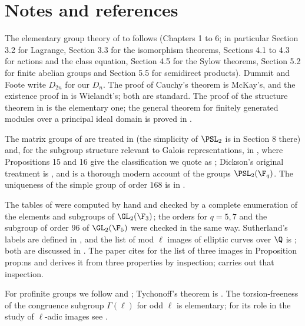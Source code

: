 \section{Notes and references}\label{sec:groups:notes}

The elementary group theory of  to  follows \cite{DummitFoote} (Chapters 1 to 6; in particular Section 3.2 for
Lagrange, Section 3.3 for the isomorphism theorems, Sections 4.1 to 4.3 for actions and the class equation, Section 4.5 for the Sylow theorems, Section 5.2 for
finite abelian groups and Section 5.5 for semidirect products). Dummit and Foote write $D_{2n}$ for our $D_n$. The proof of Cauchy's theorem is McKay's, and the
existence proof in  is Wielandt's; both are standard. The proof of the structure theorem in  is the elementary
one; the general theorem for finitely generated modules over a principal ideal domain is proved in .

The matrix groups of  are treated in \cite[Chapter XIII]{Lang} (the simplicity of $\PSL_2$ is in Section 8 there) and, for the subgroup
structure relevant to Galois representations, in \cite[Section 2]{Serre72}, where Propositions 15 and 16 give the classification we quote as
; Dickson's original treatment is \cite{Dickson1901}, and \cite[Chapter II, Section 8]{Huppert67} is a thorough modern account of the groups
$\PSL_2(\F_q)$. The uniqueness of the simple group of order $168$ is in \cite[Section 6.2]{DummitFoote}.

The tables of  were computed by hand and checked by a complete enumeration of the elements and subgroups of $\GL_2(\F_3)$; the orders for
$q=5,7$ and the subgroup of order $96$ of $\GL_2(\F_5)$ were checked in the same way. Sutherland's labels are defined in \cite{Sutherland16}, and the list of mod $\ell$
images of elliptic curves over $\Q$ is \cite{Zywina15}; both are discussed in . The paper cites \cite{Zywina15} for the list of three images in
Proposition prop:ns and derives it from three properties by inspection;  carries out that inspection.

For profinite groups we follow \cite[Chapter IV, Sections 1 and 2]{Neukirch} and \cite[Chapter I, Section 1]{NSW}; Tychonoff's theorem is \cite[Theorem 37.3]{Munkres00}.
The torsion-freeness of the congruence subgroup $\Gamma(\ell)$ for odd $\ell$ is elementary; for its role in the study of $\ell$-adic images see \cite[Section 4]{Serre72}.

